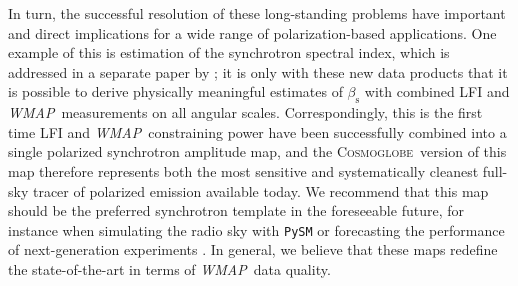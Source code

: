 \documentclass[twocolumn]{../../common/aa}
\def\WMAP{\emph{WMAP}}
\def\WMAPnine{\emph{WMAP9}}
\def\planck{\emph{Planck}}
\def\Planck{\emph{Planck}}
\newcommand{\cosmoglobe}{\textsc{Cosmoglobe}}
\newcommand{\K}[0]{\textit K}
\begin{document}
In turn, the successful resolution of these long-standing problems have important and direct implications for a wide range of polarization-based applications. One example of this is estimation of the synchrotron spectral index, which is addressed in a separate paper by \citet{fuskeland:2023}; it is only with these new data products that it is possible to derive physically meaningful estimates of $\beta_{\mathrm{s}}$ with combined LFI and \WMAP\ measurements on all angular scales. Correspondingly, this is the first time LFI and \WMAP\ constraining power have been successfully combined into a single polarized synchrotron amplitude map, and the \cosmoglobe\ version of this map therefore represents both the most sensitive and systematically cleanest full-sky tracer of polarized emission available today. We recommend that this map should be the preferred synchrotron template in the foreseeable future, for instance when simulating the radio sky with \texttt{PySM} \citep{pysm} or forecasting the performance of next-generation experiments \citep[e.g.,][]{ptep,aurlien:2022}. In general, we believe that these maps redefine the state-of-the-art in terms of \WMAP\ data quality.


\end{document}
